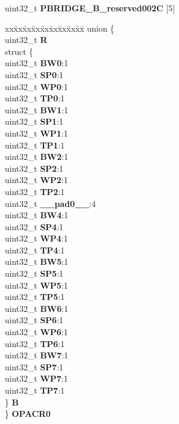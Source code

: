 \begin{DoxyCompactItemize}
\begin{tabbing}
\end{tabbing}\item 
\mbox{\label{structPBRIDGE__B__tag_a5a5e10fd4bbd05b5a85ba9fa6bdb632b}} 
uint32\+\_\+t {\bfseries P\+B\+R\+I\+D\+G\+E\+\_\+\+B\+\_\+reserved002C} \mbox{[}5\mbox{]}
\item 
\mbox{\label{structPBRIDGE__B__tag_a8c7e5e3f57a1899b936fe02ccc6d5d00}} 
\begin{tabbing}
xx\=xx\=xx\=xx\=xx\=xx\=xx\=xx\=xx\=\kill
union \{\\
\>uint32\_t {\bfseries R}\\
\>struct \{\\
\>\>uint32\_t {\bfseries BW0}:1\\
\>\>uint32\_t {\bfseries SP0}:1\\
\>\>uint32\_t {\bfseries WP0}:1\\
\>\>uint32\_t {\bfseries TP0}:1\\
\>\>uint32\_t {\bfseries BW1}:1\\
\>\>uint32\_t {\bfseries SP1}:1\\
\>\>uint32\_t {\bfseries WP1}:1\\
\>\>uint32\_t {\bfseries TP1}:1\\
\>\>uint32\_t {\bfseries BW2}:1\\
\>\>uint32\_t {\bfseries SP2}:1\\
\>\>uint32\_t {\bfseries WP2}:1\\
\>\>uint32\_t {\bfseries TP2}:1\\
\>\>uint32\_t {\bfseries \_\_pad0\_\_}:4\\
\>\>uint32\_t {\bfseries BW4}:1\\
\>\>uint32\_t {\bfseries SP4}:1\\
\>\>uint32\_t {\bfseries WP4}:1\\
\>\>uint32\_t {\bfseries TP4}:1\\
\>\>uint32\_t {\bfseries BW5}:1\\
\>\>uint32\_t {\bfseries SP5}:1\\
\>\>uint32\_t {\bfseries WP5}:1\\
\>\>uint32\_t {\bfseries TP5}:1\\
\>\>uint32\_t {\bfseries BW6}:1\\
\>\>uint32\_t {\bfseries SP6}:1\\
\>\>uint32\_t {\bfseries WP6}:1\\
\>\>uint32\_t {\bfseries TP6}:1\\
\>\>uint32\_t {\bfseries BW7}:1\\
\>\>uint32\_t {\bfseries SP7}:1\\
\>\>uint32\_t {\bfseries WP7}:1\\
\>\>uint32\_t {\bfseries TP7}:1\\
\>\} {\bfseries B}\\
\} {\bfseries OPACR0}\\


\end{tabbing}
\end{DoxyCompactItemize}
